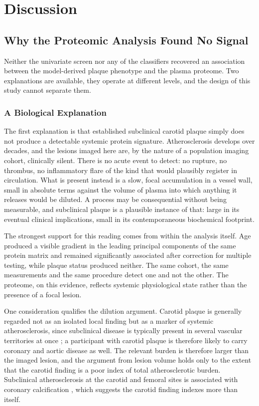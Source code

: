 \chapter{Discussion}
\label{ch:discussion}

\section{Why the Proteomic Analysis Found No Signal}
\label{sec:discussion-phase1a}

Neither the univariate screen nor any of the classifiers recovered an association between the
model-derived plaque phenotype and the plasma proteome. Two explanations are available, they
operate at different levels, and the design of this study cannot separate them.

\subsection{A Biological Explanation}

The first explanation is that established subclinical carotid plaque simply does not produce a
detectable systemic protein signature. Atherosclerosis develops over decades, and the lesions
imaged here are, by the nature of a population imaging cohort, clinically silent. There is no
acute event to detect: no rupture, no thrombus, no inflammatory flare of the kind that would
plausibly register in circulation. What is present instead is a slow, focal accumulation in a
vessel wall, small in absolute terms against the volume of plasma into which anything it releases
would be diluted. A process may be consequential without being measurable, and subclinical plaque
is a plausible instance of that: large in its eventual clinical implications, small in its
contemporaneous biochemical footprint.

The strongest support for this reading comes from within the analysis itself. Age produced a
visible gradient in the leading principal components of the same protein matrix and remained
significantly associated after correction for multiple testing, while plaque status produced
neither. The same cohort, the same measurements and the same procedure detect one and not the
other. The proteome, on this evidence, reflects systemic physiological state rather than the
presence of a focal lesion.

One consideration qualifies the dilution argument. Carotid plaque is generally regarded not as an
isolated local finding but as a marker of systemic atherosclerosis, since subclinical disease is
typically present in several vascular territories at once \cite{fernandezfriera2015pesa}; a
participant with carotid plaque is therefore likely to carry coronary and aortic disease as well. The relevant burden is therefore
larger than the imaged lesion, and the argument from lesion volume holds only to the extent that
the carotid finding is a poor index of total atherosclerotic burden. Subclinical atherosclerosis
at the carotid and femoral sites is associated with coronary calcification
\cite{laclaustra2016femoral}, which suggests the carotid finding indexes more than itself.

